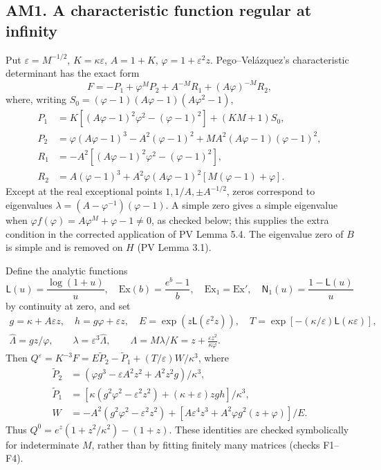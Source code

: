 \subsection{AM1. A characteristic function regular at infinity}
Put $\varepsilon=M^{-1/2}$, $K=\kappa\varepsilon$, $A=1+K$, $\varphi=1+\varepsilon^2z$.
Pego--Velázquez's characteristic determinant has the exact form
\[
 F=-P_1+\varphi^MP_2+A^{-M}R_1+(A\varphi)^{-M}R_2,
\]
where, writing $S_0=(\varphi-1)(A\varphi-1)(A\varphi^2-1)$,
\begin{align*}
 P_1&=K[(A\varphi-1)^2\varphi^2-(\varphi-1)^2]+(KM+1)S_0,\\
 P_2&=\varphi(A\varphi-1)^3-A^2(\varphi-1)^2+MA^2(A\varphi-1)(\varphi-1)^2,\\
 R_1&=-A^2[(A\varphi-1)^2\varphi^2-(\varphi-1)^2],\\
 R_2&=A(\varphi-1)^3+A^2\varphi(A\varphi-1)^2[M(\varphi-1)+\varphi].
\end{align*}
Except at the real exceptional points $1,1/A,\pm A^{-1/2}$, zeros correspond to eigenvalues
$\lambda=(A-\varphi^{-1})(\varphi-1)$. A simple zero gives a simple eigenvalue when
$\varphi f(\varphi)=A\varphi^M+\varphi-1\ne0$, as checked below; this supplies the
extra condition in the corrected application of PV Lemma 5.4. The eigenvalue zero of $B$
is simple and is removed on $H$ (PV Lemma 3.1).

Define the analytic functions
\[
 \mathsf L(u)=\frac{\log(1+u)}u,\quad
 \mathrm{Ex}(b)=\frac{e^b-1}b,\quad \mathrm{Ex}_1=\mathrm{Ex}',\quad
 \mathsf N_1(u)=\frac{1-\mathsf L(u)}u
\]
by continuity at zero, and set
\begin{gather*}
 g=\kappa+A\varepsilon z,\quad h=g\varphi+\varepsilon z,\quad
 E=\exp(z\mathsf L(\varepsilon^2z)),\quad
 T=\exp[-(\kappa/\varepsilon)\mathsf L(\kappa\varepsilon)],\\
 \widehat\Lambda=gz/\varphi,\qquad
 \lambda=\varepsilon^3\widehat\Lambda,\qquad
 \Lambda=M\lambda/K=z+\frac{\varepsilon z^2}{\kappa\varphi}.
\end{gather*}
Then $Q^\varepsilon=K^{-3}F=E\widetilde P_2-\widetilde P_1+(T/\varepsilon)W/\kappa^3$, where
\begin{align*}
 \widetilde P_2&=(\varphi g^3-\varepsilon A^2z^2+A^2z^2g)/\kappa^3,\\
 \widetilde P_1&=[\kappa(g^2\varphi^2-\varepsilon^2z^2)+(\kappa+\varepsilon)zgh]/\kappa^3,\\
 W&=-A^2(g^2\varphi^2-\varepsilon^2z^2)
       +[A\varepsilon^4z^3+A^2\varphi g^2(z+\varphi)]/E.
\end{align*}
Thus $Q^0=e^z(1+z^2/\kappa^2)-(1+z)$. These identities are checked symbolically
for indeterminate $M$, rather than by fitting finitely many matrices (checks F1--F4).

